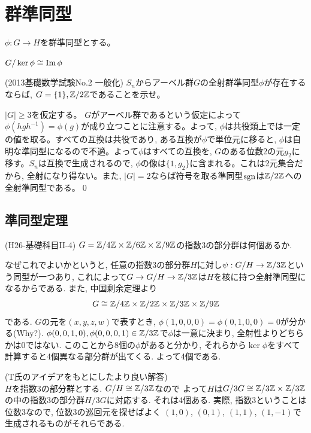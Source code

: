 \section{群準同型}
\begin{prop}
$\phi:G\to H$を群準同型とする。
\ben
\item {}
\item $G/\ker{\phi} \cong \mathrm{Im}\,\phi$
\een
\end{prop}


\begin{egprob} (2013基礎数学試験No.2 一般化)
$S_n$からアーベル群$G$の全射群準同型$\phi$が存在するならば, $G=\{ 1 \}, \mathbb{Z}/2\mathbb{Z}$であることを示せ。
\end{egprob}
\begin{egans}

$|G| \geq 3$を仮定する。 $G$がアーベル群であるという仮定によって$\phi(hgh^{-1}) = \phi(g)$が成り立つことに注意する。よって, $\phi$は共役類上では一定の値を取る。すべての互換は共役であり, ある互換が$\phi$で単位元に移ると, $\phi$は自明な準同型になるので不適。よって$\phi$はすべての互換を, $G$のある位数2の元$g_2$に移す。$S_n$は互換で生成されるので, $\phi$の像は$\{ 1 , g_2\}$に含まれる。これは2元集合だから, 全射になり得ない。また, $|G| = 2$ならば符号を取る準同型$\mathrm{sgn}$は$\mathbb{Z}/2\mathbb{Z}$への全射準同型である。\qed
\end{egans}

\subsection{準同型定理}

\begin{egprob} (H26-基礎科目II-4)
$G = \mathbb{Z}/4\mathbb{Z}\times \mathbb{Z}/6\mathbb{Z}\times \mathbb{Z}/9\mathbb{Z}$の指数3の部分群は何個あるか.
\end{egprob}
\begin{egans}
 なぜこれでよいかというと, 任意の指数$3$の部分群$H$に対し$\psi :G/H \to \mathbb{Z}/3\mathbb{Z}$という同型が一つあり, これによって$G\to G/H \to \mathbb{Z}/3\mathbb{Z}$は$H$を核に持つ全射準同型になるからである. また, 中国剰余定理より
\[G\cong \mathbb{Z}/4\mathbb{Z}\times \mathbb{Z}/2\mathbb{Z} \times \mathbb{Z}/3\mathbb{Z} \times \mathbb{Z}/9\mathbb{Z}\]
である. $G$の元を$(x,y,z,w)$で表すとき, $\phi(1,0,0,0) = \phi(0,1,0,0) = 0$が分かる(Why?). $\phi(0,0,1,0), \phi(0,0,0,1)\in \mathbb{Z}/3\mathbb{Z}$で$\phi$は一意に決まり, 全射性よりどちらかは0ではない. このことから8個の$\phi$があると分かり, それらから$\ker{\phi}$をすべて計算すると4個異なる部分群が出てくる. よって4個である.
\end{egans}
\begin{egans} (T氏のアイデアをもとにしたより良い解答)\\
$H$を指数$3$の部分群とする. $G/H \cong \mathbb{Z}/3\mathbb{Z}$なので  よって$H$は$G/3G \cong \mathbb{Z}/3\mathbb{Z} \times \mathbb{Z}/3\mathbb{Z}$の中の指数$3$の部分群$H/3G$に対応する. それは4個ある. 実際, 指数3ということは位数3なので, 位数3の巡回元を探せばよく $(1,0)$, $(0,1)$, $(1,1)$, $(1,-1)$で生成されるものがそれらである.
\end{egans}



